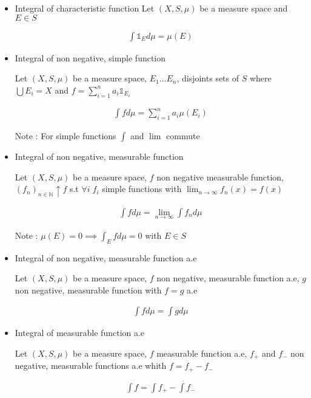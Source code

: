 \begin{itemize}
\item Integral of characteristic function
Let $(X,S,\mu)$ be a measure space and $E\in S$

\begin{align}
\int \mathbb{1}_E d\mu =  \mu(E)
\end{align}


\item Integral of non negative, simple function

Let $(X,S,\mu)$ be a measure space, $E_1 \dots E_n$, disjoints sets of $S$ where $\bigcup E_i = X$ and $f = \sum_{i=1}^na_i\mathbb{1}_{E_i}$

\begin{align}
\int fd\mu =  \sum_{i=1}^na_i\mu(E_i)
\end{align}

Note : For simple functions $\int$ and $\lim$ commute


\item Integral of non negative, measurable function

Let $(X,S,\mu)$ be a measure space,  $f$ non negative measurable function, $(f_n)_{n \in \mathbb{N}} \uparrow f$ s.t $\forall i \;f_i$ simple functions with $\lim_{n \to \infty}f_n(x) = f(x)$ 

\begin{align}
\int fd\mu =  \lim_{n \to \infty}\int f_nd\mu
\end{align}

Note : $\mu(E) = 0 \implies \int_E fd\mu = 0$ with $E \in S$
    

\item Integral of non negative, measurable function a.e

Let $(X,S,\mu)$ be a measure space, $f$ non negative, measurable function a.e, $g$ non negative, measurable function with $f = g$ a.e

\begin{align}
\int fd\mu =  \int gd\mu
\end{align}


\item Integral of measurable function a.e

Let $(X,S,\mu)$ be a measure space, $f$ measurable function a.e, $f_+$ and  $f_-$ non negative, measurable functions a.e whith $f = f_+ - f_-$

\begin{align}
\int f =  \int f_+ - \int f_-
\end{align}
\end{itemize}

